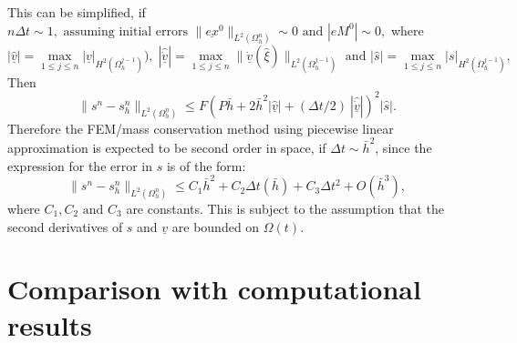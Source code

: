 \documentclass[11pt]{article}
\newcommand{\pl}{\partial}
\newcommand{\D}{\Delta}
\newcommand{\ul}{\underline}
\newcommand{\Om}{\Omega}
\newcommand{\al}{\mathrm{\alpha}}
\begin{document}
This can be simplified, if $n\D{t} \sim 1, \text{ assuming initial errors } \|\ul{ex}^0\|_{L^2(\Om^n_h)}\sim 0 \text{ and } |eM^0| \sim 0, $ 
where $$|\hat{\ul{v}}| = \max_{1\leq{j}\leq{n}}|\ul{v}|_ {H^2(\Om_h^{j-1})}), \; |\hat{\dot{\ul{v}}}|=\max_{1\leq j \leq n}\|\dot{\ul{v}}(\hat{\xi})\|_{L^{2}(\Om_h^{j-1})} \text { and } |\hat{s}|=\max_{1\leq{j}\leq n}|s|_{H^2(\Om^{j-1}_h)},$$
Then
$$\|s^n-s_h^n\|_{L^2(\Om_h^n)} \leq  F\left(P\bar{h}+2 \bar{h}^2|\hat{\ul{v}}|  + ( \D{t}/2)\ |\hat{\dot{\ul{v}}}|      \right)^2|\hat{s}|.$$
Therefore the FEM/mass conservation method using piecewise linear approximation is expected to be second order in space, if $\D{t} \sim \bar{h}^2$, since the expression for the error in $s$ is of the form:
\begin{equation}
\label{eq:errest}
 \|s^n-s_h^n\|_{L^2(\Om_h^n)} \leq C_1\bar{h}^2 + C_2\D{t}(\bar{h})+ C_3\D{t}^2 + O({\bar{h}^3}),
 \end{equation}
where $C_1,C_2 \text{ and } C_3$ are constants. This is subject to the assumption that the second derivatives of $s$ and $\ul{v}$ are bounded on $\Om(t)$.
\section{Comparison with computational results}
%
%					
%
\end{document}
